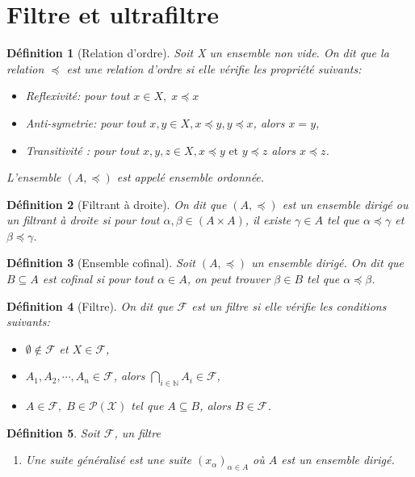 \documentclass[a4paper, 12pt]{report}
\theoremstyle{break}
\newtheorem{defin}{Définition}[section]
\begin{document}
\section{Filtre et ultrafiltre}
\begin{defin}[Relation d'ordre]
       Soit X un ensemble non vide. On dit que la relation $\preccurlyeq$ est une relation d'ordre si elle vérifie les propriété suivants:
       \begin{itemize}
              \item Reflexivité: pour tout $x \in X, \; x \preccurlyeq x$
              \item Anti-symetrie:  pour tout $x, y \in X, x \preccurlyeq y, y \preccurlyeq x$, alors $x=y$,
              \item Transitivité : pour tout $x,y,z \in X, x \preccurlyeq y \mbox{ et } y \preccurlyeq z$ alors $x \preccurlyeq z$.
       \end{itemize}
       L'ensemble $(A, \preccurlyeq)$ est appelé ensemble ordonnée.
\end{defin}

\begin{defin}[Filtrant à droite]
        On dit que $(A, \preccurlyeq)$ est un ensemble dirigé ou un filtrant à droite si pour tout $\alpha, \beta \in (A \times A)$, il existe $\gamma \in A$ tel que $\alpha \preccurlyeq \gamma$ et $\beta \preccurlyeq \gamma$.
\end{defin}

\begin{defin}[Ensemble cofinal]
      Soit $(A, \preccurlyeq)$ un ensemble dirigé. On dit que $B \subseteq A$ est cofinal si pour tout $\alpha \in A$, on peut trouver $\beta \in B$ tel que $\alpha \preccurlyeq \beta$.
\end{defin}

\begin{defin}[Filtre]
       On dit que $\mathcal{F}$ est un filtre si elle vérifie les conditions suivants:
       \begin{itemize}
             \item $\emptyset \not\in \mathcal{F}$ et $X \in \mathcal{F}$,
             \item $A_{1}, A_{2}, \cdots, A_{n} \in \mathcal{F}$, alors $\displaystyle \bigcap_{i \in \mathbb{N}} A_{i} \in \mathcal{F}$,
             \item $A \in \mathcal{F}, \; B \in \mathcal{P(X)}$ tel que $A \subseteq B$, alors $B \in \mathcal{F}$.
       \end{itemize}
\end{defin}

\begin{defin}
Soit $\mathcal{F}$, un filtre
\begin{enumerate}
      \item Une suite généralisé est une suite $(x_{\alpha})_{\alpha \in A}$ où $A$ est un ensemble dirigé.
\end{enumerate}
\end{defin}
\end{document}
